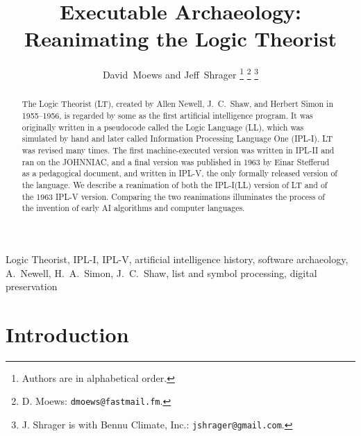 \documentclass[journal]{IEEEtran}
\begin{document}
\title{Executable Archaeology: Reanimating the Logic Theorist}

\author{David~Moews and Jeff~Shrager%
\thanks{Authors are in alphabetical order.}
\thanks{D. Moews: \texttt{dmoews@fastmail.fm}.}
\thanks{J. Shrager is with Bennu Climate, Inc.:
  \texttt{jshrager@gmail.com}.}
}

\maketitle

\begin{abstract}

The Logic Theorist (LT), created by Allen Newell, J.~C.~Shaw, and
Herbert Simon in 1955--1956, is regarded by some as the first
artificial intelligence program.  It was originally written in a
pseudocode called the Logic Language (LL), which was simulated by hand and later called Information Processing Language One (IPL-I). LT
was revised many times. The first machine-executed version was
written in IPL-II and ran on the JOHNNIAC, and a final version 
was published in 1963 by Einar Stefferud as a pedagogical document, and written in IPL-V, the only formally released version of the language.
We describe a reanimation of both the IPL-I(LL) version of LT and of the 1963 IPL-V version. Comparing the 
two reanimations illuminates the process of the invention of early AI algorithms and computer languages.

\end{abstract}

\begin{IEEEkeywords}
Logic Theorist, IPL-I, IPL-V, artificial intelligence history,
software archaeology, A.~Newell, H.~A.~Simon, J.~C.~Shaw, list and symbol
processing, digital preservation
\end{IEEEkeywords}

\section{Introduction}
\label{sec:intro}
\end{document}
